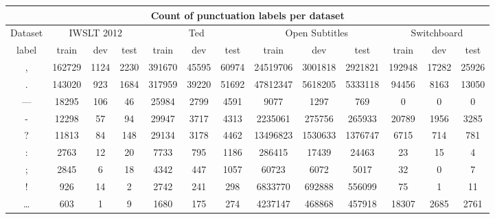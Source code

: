 \documentclass[a4paper]{article}
\begin{document}
\begin{multicols}{2}
\begin{appendices}
\begin{table*}[t]
\begin{tabular}{|c|c|c|c|c|c|c|c|c|c|c|c|c|}
\hline
 \multicolumn{13}{|c|}{Count of punctuation labels per dataset} \\
 \hline
 Dataset & \multicolumn{3}{|c|}{IWSLT 2012} & \multicolumn{3}{|c|}{Ted} & \multicolumn{3}{|c|}{Open Subtitles} & \multicolumn{3}{|c|}{Switchboard}\\
 \hline 
label &  train   & dev   & test  & train   & dev    & test   & train     & dev      & test & train   & dev    & test  \\
\hline
,     &  162729  & 1124  & 2230  & 391670  & 45595  & 60974  & 24519706  & 3001818  & 2921821 & 192948 & 17282 & 25926 \\
.     &  143020  & 923   & 1684  & 317959  & 39220  & 51692  & 47812347  & 5618205  & 5333118 &  94456 &  8163 & 13050 \\
--- &  18295   & 106   & 46    & 25984   & 2799   & 4591   & 9077      & 1297     & 769     &      0 &     0 &     0 \\
-     &  12298   & 57    & 94    & 29947   & 3717   & 4313   & 2235061   & 275756   & 265933  &  20789 &  1956 &  3285 \\
?     &  11813   & 84    & 148   & 29134   & 3178   & 4462   & 13496823  & 1530633  & 1376747 &   6715 &   714 &   781 \\
:     &  2763    & 12    & 20    & 7733    & 795    & 1186   & 286415    & 17439    & 24463   &     23 &    15 &     4 \\
;     &  2845    & 6     & 18    & 4342    & 447    & 1057   & 60723     & 6072     & 5017    &     32 &     0 &     7 \\
!     &  926     & 14    & 2     & 2742    & 241    & 298    & 6833770   & 692888   & 556099  &     75 &     1 &    11 \\
…     &  603     & 1     & 9     & 1680    & 175    & 274    & 4237147   & 468868   & 457918  &  18307 &  2685 &  2761 \\



\end{tabular}
\end{table*}
\end{appendices}
\end{multicols}
\end{document}

